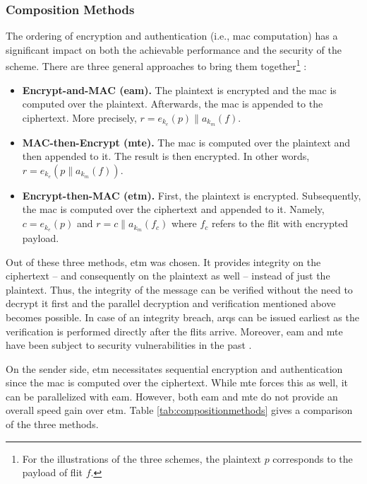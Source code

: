 \subsubsection{Composition Methods}
The ordering of encryption and authentication (i.e., \gls{mac} computation) has a significant impact on both the achievable performance and the
security of the scheme. There are three general approaches to bring them together\footnote{For the illustrations of the three schemes, the plaintext
$p$ corresponds to the payload of flit $f$.} \cite{bellare00authenc}:
\begin{itemize}
    \item \textbf{Encrypt-and-MAC (\gls{eam}).} The plaintext is encrypted and the \gls{mac} is computed over the plaintext. Afterwards, the \gls{mac} is
        appended to the ciphertext. More precisely, $r = e_{k_e}(p)\|a_{k_m}(f)$.
    \item \textbf{MAC-then-Encrypt (\gls{mte}).} The \gls{mac} is computed over the plaintext and then appended to it. The result is then
        encrypted. In other words, $r = e_{k_e}(p\|a_{k_m}(f))$.
    \item \textbf{Encrypt-then-MAC (\gls{etm}).} First, the plaintext is encrypted. Subsequently, the \gls{mac} is computed over the ciphertext and appended to it.
        Namely, $c = e_{k_e}(p)$ and $r = c\|a_{k_m}(f_c)$ where $f_c$ refers to the flit with encrypted payload.
\end{itemize}
\vspace{0.5\baselineskip}

Out of these three methods, \gls{etm} was chosen. It provides integrity on the ciphertext -- and consequently on the plaintext as well --
instead of just the plaintext. Thus, the integrity of the message can be verified without the need to decrypt it first and the parallel decryption and
verification mentioned above becomes possible. In case of an integrity breach, \glspl{arq} can be issued earliest as the verification is
performed directly after the flits arrive. Moreover, \gls{eam} and \gls{mte} have been subject to security vulnerabilities in the past
\cites{bellare00authenc}{bellare04ssheam}{etmtls}.

On the sender side, \gls{etm} necessitates sequential encryption and authentication since the \gls{mac} is computed over the ciphertext. While
\gls{mte} forces this as well, it can be parallelized with \gls{eam}. However, both \gls{eam} and \gls{mte} do not provide an overall speed gain over
\gls{etm}. Table \ref{tab:compositionmethods} gives a comparison of the three methods.


